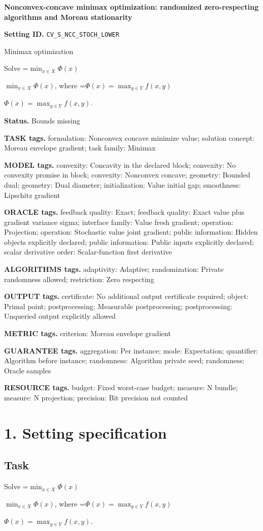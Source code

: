 \documentclass[10pt,a4paper]{article}
\newcommand{\AtlasMath}[1]{\par\begingroup\centering\setbox0=\hbox{$\displaystyle #1$}\ifdim\wd0>1.4\linewidth\typeout{ATLAS WIDE FORMULA: \the\wd0}\fi\ifdim\wd0>\linewidth\resizebox{\linewidth}{!}{\box0}\else\box0\fi\par\endgroup}
\newcommand{\AtlasInlineMath}[1]{\begingroup\setbox0=\hbox{$#1$}\ifdim\wd0>.4\linewidth\endgroup\AtlasMath{#1}\else\endgroup$#1$\fi}
\begin{document}
\raggedright

{\LARGE\bfseries\sffamily\color{AtlasNavy} Nonconvex-concave minimax optimization: randomized zero-respecting algorithms and Moreau stationarity\par}\vspace{5pt}
\textbf{Setting ID.} \texttt{CV\_\allowbreak{}S\_\allowbreak{}NCC\_\allowbreak{}STOCH\_\allowbreak{}LOWER}

Minimax optimization

Solve \AtlasInlineMath{\min_{x\in X}\Phi(x)}, where \AtlasInlineMath{\Phi(x)=\max_{y\in Y}f(x,y)}.

\textbf{Status.} Bounds missing

\textbf{TASK tags.} formulation: Nonconvex concave minimize value; solution concept: Moreau envelope gradient; task family: Minimax

\textbf{MODEL tags.} convexity: Concavity in the declared block; convexity: No convexity promise in block; convexity: Nonconvex concave; geometry: Bounded dual; geometry: Dual diameter; initialization: Value initial gap; smoothness: Lipschitz gradient

\textbf{ORACLE tags.} feedback quality: Exact; feedback quality: Exact value plus gradient variance sigma; interface family: Value fresh gradient; operation: Projection; operation: Stochastic value joint gradient; public information: Hidden objects explicitly declared; public information: Public inputs explicitly declared; scalar derivative order: Scalar-function first derivative

\textbf{ALGORITHMS tags.} adaptivity: Adaptive; randomization: Private randomness allowed; restriction: Zero respecting

\textbf{OUTPUT tags.} certificate: No additional output certificate required; object: Primal point; postprocessing: Measurable postprocessing; postprocessing: Unqueried output explicitly allowed

\textbf{METRIC tags.} criterion: Moreau envelope gradient

\textbf{GUARANTEE tags.} aggregation: Per instance; mode: Expectation; quantifier: Algorithm before instance; randomness: Algorithm private seed; randomness: Oracle samples

\textbf{RESOURCE tags.} budget: Fixed worst-case budget; measure: N bundle; measure: N projection; precision: Bit precision not counted

\section{1. Setting specification}
\subsection{Task}
Solve \AtlasInlineMath{\min_{x\in X}\Phi(x)}, where \AtlasInlineMath{\Phi(x)=\max_{y\in Y}f(x,y)}.
\end{document}
